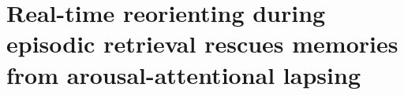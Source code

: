 \chapter{Real-time reorienting during episodic retrieval rescues memories from arousal-attentional lapsing}